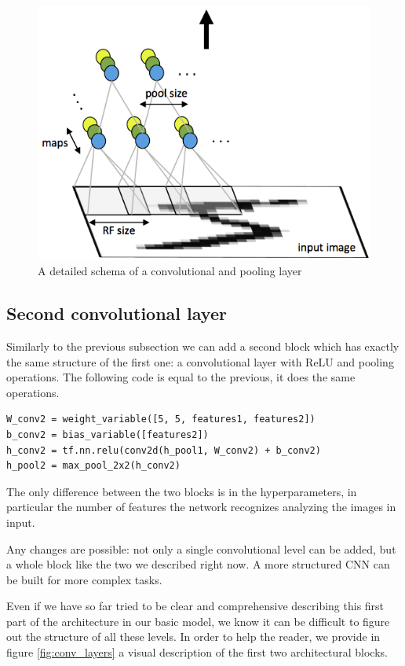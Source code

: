 \begin{figure}
	\centering
	\includegraphics[width=1\textwidth]{Images/conv_layer}
	\caption{A detailed schema of a convolutional and pooling layer}
	\label{fig:conv_layer}
\end{figure}

\subsection{Second convolutional layer}

Similarly to the previous subsection we can add a second block which has exactly the same structure of the first one: a convolutional layer with \acs{ReLU} and pooling operations. The following code is equal to the previous, it does the same operations.

\begin{lstlisting}
W_conv2 = weight_variable([5, 5, features1, features2])
b_conv2 = bias_variable([features2])
h_conv2 = tf.nn.relu(conv2d(h_pool1, W_conv2) + b_conv2)
h_pool2 = max_pool_2x2(h_conv2)
\end{lstlisting}

The only difference between the two blocks is in the hyperparameters, in particular the number of features the network recognizes analyzing the images in input.

Any changes are possible: not only a single convolutional level can be added, but a whole block like the two we described right now. A more structured \acs{CNN} can be built for more complex tasks.

Even if we have so far tried to be clear and comprehensive describing this first part of the architecture in our basic model, we know it can be difficult to figure out the structure of all these levels. In order to help the reader, we provide in figure \ref{fig:conv_layers} a visual description of the first two architectural blocks.

